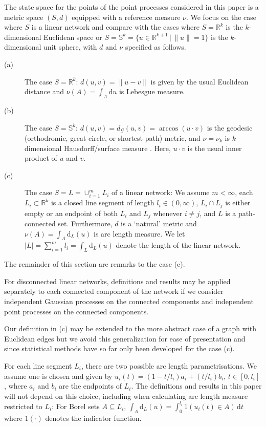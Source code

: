 \documentclass[alpha-refs]{wiley-article}
\begin{document}
The state space for the points of the point processes considered in this paper is a metric space $(S,d)$ equipped with a reference measure $\nu$. We focus on the case where $S$ is a linear network and compare with the cases where $S=\mathbb R^k$ is the $k$-dimensional Euclidean space or 
$S=\mathbb S^k=\{u\in \mathbb R^{k+1}\,|\, \|u\|=1\}$ is the $k$-dimensional unit sphere, with $d$ and $\nu$ specified as follows.
\begin{description}
\item[(a)] The case $S=\mathbb R^k$: $d(u,v)=\|u-v\|$ is given by the usual Euclidean distance and $\nu(A)=\int_A\mathrm du$ is Lebesgue measure.
\item[(b)] The case $S=\mathbb S^k$: $d(u,v)=d_\mathcal{G}(u,v)=\arccos(u\cdot v)$ is the geodesic (orthodromic, great-circle, or shortest path) metric, and $\nu=\nu_k$ is $k$-dimensional Hausdorff/surface measure \citep[see e.g.][Chapter~1]{MR3060033}.
 Here, $u\cdot v$ is the usual inner product of $u$ and $v$. 
 \item[(c)] The case $S=L=\cup_{i=1}^m L_i$ of a linear network: We assume $m<\infty$, each $L_i\subset\mathbb R^k$ is a closed line segment of  length $l_i\in (0,\infty)$, $L_i\cap L_j$ is either empty or an endpoint of both $L_i$ and $L_j$ whenever $i\not=j$, and $L$ is a path-connected set. Furthermore, $d$ is a `natural' metric and $\nu(A)=\int_A\mathrm d_L(u)$ is arc length measure. We let $|L|=\sum_{i=1}^m l_i=\int_L\mathrm d_L(u)$ denote the length of the linear network.
\end{description} 
The remainder of this section are remarks 
to the case (c). 

For disconnected linear networks, definitions and results may be applied
separately to each connected component of the network if we consider independent Gaussian processes on the connected components and independent point processes on the connected components.

Our definition in (c) may be extended to the more abstract case of a graph with Euclidean edges  \citep{AnderesEtAl} but 
we avoid this generalization %
for ease of presentation and %
since statistical methods have so far only been developed for the case (c). 

For each line segment $L_i$, there are two possible arc length parametrisations. We assume one is chosen and given by $u_i(t)=(1-t/l_i)a_i+(t/l_i)b_i$, $t\in[0,l_i]$, where $a_i$ and $b_i$ are the endpoints of $L_i$. The definitions and results in this paper will not depend on this choice, including when calculating arc length measure restricted to $L_i$: For Borel sets $A\subseteq L_i$, $\int_A \mathrm d_L(u)=\int_0^{l_i}1(u_i(t)\in A)\,\mathrm dt$ where $1(\cdot)$ denotes the indicator function. 
 
\end{document}
